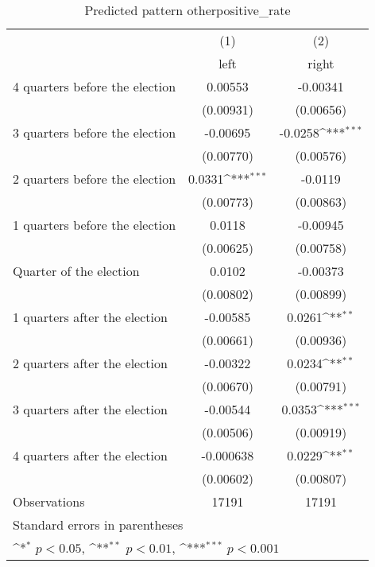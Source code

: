 \begin{table}[htbp]\centering
\def\sym#1{\ifmmode^{#1}\else\(^{#1}\)\fi}
\caption{Predicted pattern otherpositive\_rate}
\begin{tabular}{l*{2}{c}}
\hline\hline
                    &\multicolumn{1}{c}{(1)}&\multicolumn{1}{c}{(2)}\\
                    &\multicolumn{1}{c}{left}&\multicolumn{1}{c}{right}\\
\hline
 4 quarters before the election&     0.00553         &    -0.00341         \\
                    &   (0.00931)         &   (0.00656)         \\
[1em]
 3 quarters before the election&    -0.00695         &     -0.0258\sym{***}\\
                    &   (0.00770)         &   (0.00576)         \\
[1em]
 2 quarters before the election&      0.0331\sym{***}&     -0.0119         \\
                    &   (0.00773)         &   (0.00863)         \\
[1em]
 1 quarters before the election&      0.0118         &    -0.00945         \\
                    &   (0.00625)         &   (0.00758)         \\
[1em]
Quarter of the election&      0.0102         &    -0.00373         \\
                    &   (0.00802)         &   (0.00899)         \\
[1em]
 1 quarters after the election&    -0.00585         &      0.0261\sym{**} \\
                    &   (0.00661)         &   (0.00936)         \\
[1em]
 2 quarters after the election&    -0.00322         &      0.0234\sym{**} \\
                    &   (0.00670)         &   (0.00791)         \\
[1em]
 3 quarters after the election&    -0.00544         &      0.0353\sym{***}\\
                    &   (0.00506)         &   (0.00919)         \\
[1em]
 4 quarters after the election&   -0.000638         &      0.0229\sym{**} \\
                    &   (0.00602)         &   (0.00807)         \\
\hline
Observations        &       17191         &       17191         \\
\hline\hline
\multicolumn{3}{l}{\footnotesize Standard errors in parentheses}\\
\multicolumn{3}{l}{\footnotesize \sym{*} \(p<0.05\), \sym{**} \(p<0.01\), \sym{***} \(p<0.001\)}\\
\end{tabular}
\end{table}
